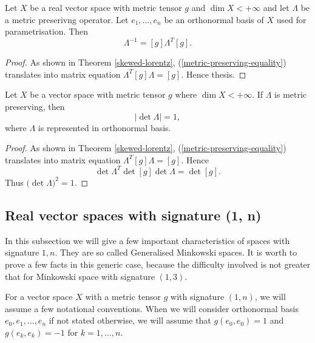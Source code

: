 \documentclass[main.tex]{subfiles}
\begin{document}
\begin{theorem}
\label{metric-preserving-inverse-representation}
Let $X$ be a real vector space with metric tensor $g$ and $\dim X < +\infty$ and let $\Lambda$ be a metric preserivng operator. Let $e_1, \dots, e_n$ be an orthonormal basis of $X$ used for parametrisation. Then
\begin{equation}
\Lambda^{-1} = [g]\Lambda^T[g] .
\end{equation}
\end{theorem}
\begin{proof}
As shown in Theorem \ref{skewed-lorentz}, (\ref{metric-preserving-equality}) translates into matrix equation $\Lambda^T[g]\Lambda = [g]$. Hence thesis.
\end{proof}

\begin{theorem}
Let $X$ be a vector space with metric tensor $g$ where $\dim X < +\infty$. If $\Lambda$ is metric preserving, then
\begin{equation}
|\det \Lambda| = 1, 
\end{equation}
where $\Lambda$ is represented in orthonormal basis. 
\end{theorem}
\begin{proof}
As shown in Theorem \ref{skewed-lorentz}, (\ref{metric-preserving-equality}) translates into matrix equation $\Lambda^T[g]\Lambda = [g]$. Hence
\begin{equation}
\det\Lambda^T \det[g] \det \Lambda = \det [g].
\end{equation}
Thus $\big(\det \Lambda \big)^2 = 1$.  
\end{proof}


\subsection{Real vector spaces with signature (1, n)}

In this subsection we will give a few important characteristics of spaces with signature $1, n$. They are so called Generalised Minkowski spaces. It is worth to prove a few facts in this generic case, because the difficulty involved is not greater that for Minkowski space with signature $(1, 3)$.

For a vector space $X$ with a metric tensor $g$ with signature $(1, n)$, we will assume a few notational conventions. When we will consider orthonormal basis $e_0, e_1, \dots, e_n$ if not stated otherwise, we will assume that 
$g(e_0, e_0) = 1$ and $g(e_k, e_k) = -1$ for $k = 1, \dots, n$.
\end{document}

